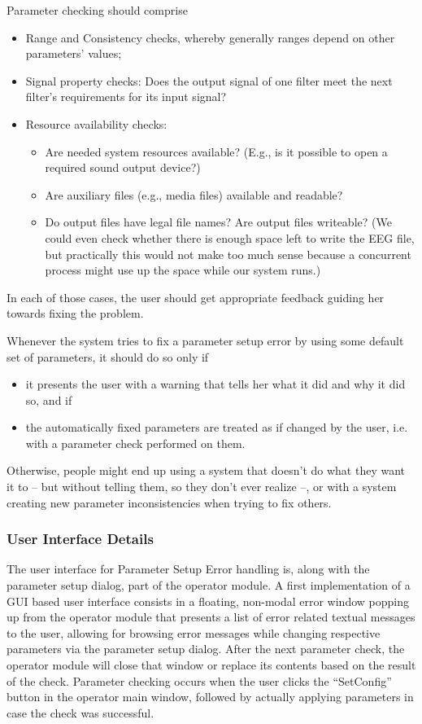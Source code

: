 \documentclass[12pt,letterpaper]{article}
\begin{document}
Parameter checking should comprise
\begin{itemize}
  \item{Range and Consistency checks,}
        whereby generally ranges depend on other parameters' values;
  \item{Signal property checks:}
        Does the output signal of one filter meet the next filter's
        requirements for its input signal?
  \item{Resource availability checks:}
  \begin{itemize}  
    \item{Are needed system resources available?}
          (E.g., is it possible to open a required sound output device?)
    \item{Are auxiliary files (e.g., media files) available and readable?}
    \item{Do output files have legal file names? Are output files writeable?}
       (We could even check whether there is enough
       space left to write the EEG file, but practically this
       would not make too much sense because a concurrent process
       might use up the space while our system runs.)
  \end{itemize}
\end{itemize}

In each of those cases, the user should get appropriate
feedback guiding her towards fixing the problem.

Whenever the system tries to fix a parameter setup error
by using some default set of parameters, it should do so
only if
\begin{itemize}
\item it presents the user with a warning that tells her
what it did and why it did so, and if
\item the automatically fixed parameters are treated as if
changed by the user, i.e. with a parameter check performed
on them.
\end{itemize}
Otherwise, people might end up using a system that doesn't
do what they want it to -- but without telling them, so they
don't ever realize --, or with a system creating new parameter
inconsistencies when trying to fix others.

\subsubsection{User Interface Details}

The user interface for Parameter Setup Error handling is,
along with the parameter setup dialog, part of the operator
module. A first implementation of a GUI based user interface
consists in a floating, non-modal error window popping up from the operator
module that presents a list of error related textual
messages to the user, allowing for browsing error messages
while changing respective parameters via the parameter setup
dialog. After the next parameter check, the operator module will close
that window or replace its contents based on the result of the check.
Parameter checking occurs when the user clicks the ``SetConfig''
button in the operator main window, followed by actually applying
parameters in case the check was successful.
\end{document}
